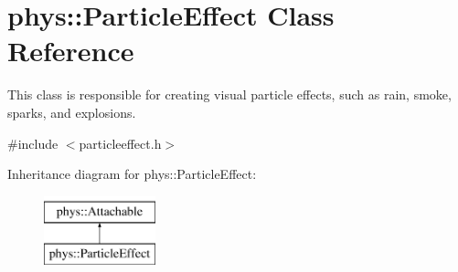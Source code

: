 \hypertarget{classphys_1_1ParticleEffect}{
\section{phys::ParticleEffect Class Reference}
\label{d2/d69/classphys_1_1ParticleEffect}
}


This class is responsible for creating visual particle effects, such as rain, smoke, sparks, and explosions.  




{\ttfamily \#include $<$particleeffect.h$>$}

Inheritance diagram for phys::ParticleEffect:\begin{figure}[H]
\begin{center}
\leavevmode
\includegraphics[height=2cm]{d2/d69/classphys_1_1ParticleEffect}
\end{center}
\end{figure}
